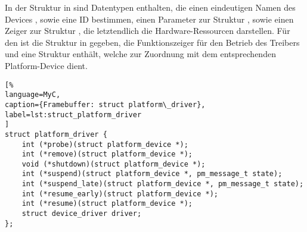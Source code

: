 In der Struktur in  sind Datentypen enthalten, die einen eindeutigen Namen des Devices , sowie eine ID   bestimmen, einen Parameter zur Struktur , sowie einen Zeiger zur Struktur , die letztendlich die Hardware-Ressourcen darstellen. Für den  ist die Struktur  in  gegeben, die Funktionszeiger für den Betrieb des Treibers und eine Struktur  enthält, welche zur Zuordnung mit dem entsprechenden Platform-Device dient.
\begin{lstlisting}[%
language=MyC,
caption={Framebuffer: struct platform\_driver},
label=lst:struct_platform_driver
]
struct platform_driver {
	int (*probe)(struct platform_device *);
	int (*remove)(struct platform_device *);
	void (*shutdown)(struct platform_device *);
	int (*suspend)(struct platform_device *, pm_message_t state);
	int (*suspend_late)(struct platform_device *, pm_message_t state);
	int (*resume_early)(struct platform_device *);
	int (*resume)(struct platform_device *);
	struct device_driver driver;
};
\end{lstlisting}

